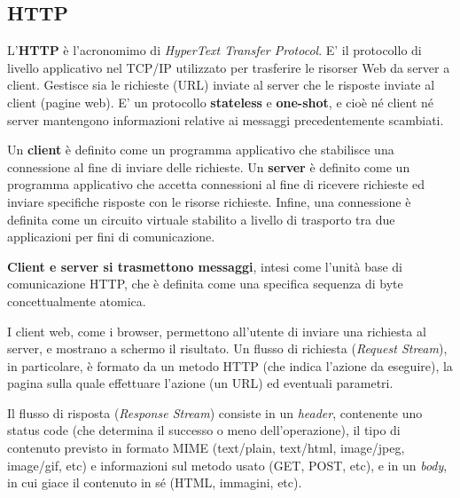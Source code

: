     \subsection{HTTP}
    
        L'\textbf{HTTP} è l'acronomimo di \textit{HyperText Transfer Protocol}. E' il protocollo di livello applicativo nel TCP/IP utilizzato per trasferire le risorser Web da server a client. Gestisce sia le richieste (URL) inviate al server che le risposte inviate al client (pagine web). E' un protocollo \textbf{stateless} e \textbf{one-shot}, e cioè né client né server mantengono informazioni relative ai messaggi precedentemente scambiati.
        
        \vspace{3mm}
        
        Un \textbf{client} è definito come un programma applicativo che stabilisce una connessione al fine di inviare delle richieste.
        Un \textbf{server} è definito come un programma applicativo che accetta connessioni al fine di ricevere richieste ed inviare specifiche risposte con le risorse richieste.
        Infine, una connessione è definita come un circuito virtuale stabilito a livello di trasporto tra due applicazioni per fini di comunicazione.
        
        \vspace{3mm}
        
        \textbf{Client e server si trasmettono messaggi}, intesi come l’unità base di comunicazione HTTP, che è definita come una specifica sequenza di byte concettualmente atomica.
        
        \vspace{3mm}
        
        I client web, come i browser, permettono all'utente di inviare una richiesta al server, e mostrano a schermo il risultato. Un flusso di richiesta (\textit{Request Stream}), in particolare, è formato da un metodo HTTP (che indica l'azione da eseguire), la pagina sulla quale effettuare l'azione (un URL) ed eventuali parametri.
        
        \vspace{3mm}
        
        Il flusso di risposta (\textit{Response Stream}) consiste in un \textit{header}, contenente uno status code (che determina il successo o meno dell'operazione), il tipo di contenuto previsto in formato MIME (text/plain, text/html, image/jpeg, image/gif, etc) e informazioni sul metodo usato (GET, POST, etc), e in un \textit{body}, in cui giace il contenuto in sé (HTML, immagini, etc).
        
